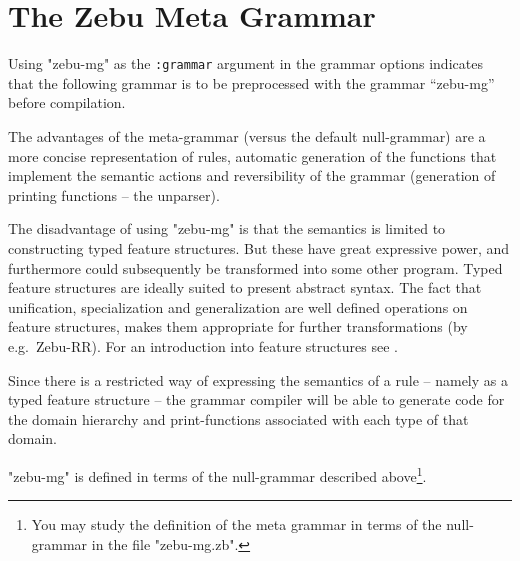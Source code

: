 \section{The {\sf Zebu} Meta Grammar}
\label{meta-grammar}

Using "zebu-mg" as the {\tt :grammar} argument in the grammar
options indicates that the following grammar is to be
preprocessed with the grammar ``zebu-mg'' before compilation.

The advantages of the meta-grammar (versus the default null-grammar)
are a more concise representation of rules, automatic generation of
the functions that implement the semantic actions and reversibility of
the grammar (generation of printing functions -- the unparser).

The disadvantage of using "zebu-mg" is that the semantics is limited
to constructing typed feature structures. 
But these have great expressive power, and furthermore could
subsequently be transformed into some other program.  Typed feature
structures are ideally suited to present abstract syntax.  The fact
that unification, specialization and generalization are well defined
operations on feature structures, makes them appropriate for further
transformations (by e.g.\ {\sf Zebu-RR}).  For an introduction into feature
structures see \cite{johnson:88}.

Since there is a restricted way of expressing the semantics of a rule
-- namely as a typed feature structure -- the grammar compiler will be
able to generate code for the domain hierarchy and print-functions
associated with each type of that domain.

"zebu-mg" is defined in terms of the null-grammar described
above\footnote{You may study the definition of the meta grammar in
terms of the null-grammar in the file "zebu-mg.zb".}.

